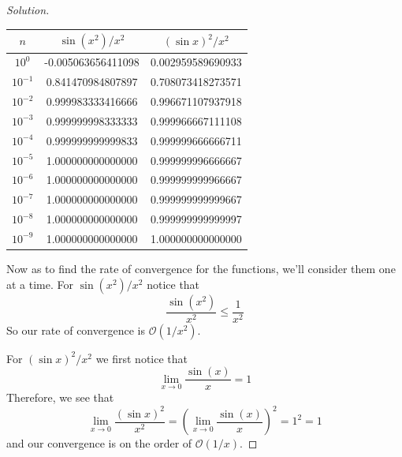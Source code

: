 \documentclass[12pt]{amsart}
\newenvironment{solution}
{\begin{proof}[Solution]}
{\end{proof}}
\begin{document}
\begin{onehalfspace}
\begin{solution}
            \centering
            \begin{tabular}{ccc}
                $n$ & $\sin(x^2)/x^2$ & $(\sin x)^2/x^2$ \\
                \hline
                $10^0$    & -0.005063656411098 & 0.002959589690933 \\
                $10^{-1}$ & 0.841470984807897 & 0.708073418273571 \\
                $10^{-2}$ & 0.999983333416666 & 0.996671107937918 \\
                $10^{-3}$ & 0.999999998333333 & 0.999966667111108 \\
                $10^{-4}$ & 0.999999999999833 & 0.999999666666711 \\
                $10^{-5}$ & 1.000000000000000 & 0.999999996666667 \\
                $10^{-6}$ & 1.000000000000000 & 0.999999999966667 \\
                $10^{-7}$ & 1.000000000000000 & 0.999999999999667 \\
                $10^{-8}$ & 1.000000000000000 & 0.999999999999997 \\
                $10^{-9}$ & 1.000000000000000 & 1.000000000000000
            \end{tabular}

            Now as to find the rate of convergence for the functions, we'll consider them one at a time.
            For $\sin(x^2)/x^2$ notice that
            \begin{displaymath}
                \frac{\sin(x^2)}{x^2} \le \frac{1}{x^2}
            \end{displaymath}
            So our rate of convergence is $\mathcal{O}(1/x^2)$.

            For $(\sin x)^2/x^2$ we first notice that
            \begin{displaymath}
                \lim_{x\rightarrow 0} \frac{\sin(x)}{x} = 1
            \end{displaymath}
            Therefore, we see that
            \begin{displaymath}
                \lim_{x\rightarrow 0} \frac{(\sin x)^2}{x^2} = \left( \lim_{x\rightarrow 0} \frac{\sin(x)}{x}\right)^2 = 1^2 = 1
            \end{displaymath}
            and our convergence is on the order of $\mathcal{O}(1/x)$.

        \end{solution}


\end{onehalfspace}
\end{document}
